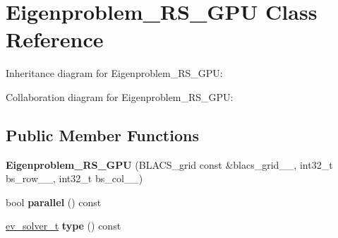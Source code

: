 \hypertarget{class_eigenproblem___r_s___g_p_u}{}\section{Eigenproblem\+\_\+\+R\+S\+\_\+\+G\+P\+U Class Reference}
\label{class_eigenproblem___r_s___g_p_u}


Inheritance diagram for Eigenproblem\+\_\+\+R\+S\+\_\+\+G\+P\+U\+:


Collaboration diagram for Eigenproblem\+\_\+\+R\+S\+\_\+\+G\+P\+U\+:
\subsection*{Public Member Functions}
\begin{DoxyCompactItemize}
\item 
\hypertarget{class_eigenproblem___r_s___g_p_u_af5e428c54a42c2e4068d11d3cfe5a10f}{}{\bfseries Eigenproblem\+\_\+\+R\+S\+\_\+\+G\+P\+U} (B\+L\+A\+C\+S\+\_\+grid const \&blacs\+\_\+grid\+\_\+\+\_\+, int32\+\_\+t bs\+\_\+row\+\_\+\+\_\+, int32\+\_\+t bs\+\_\+col\+\_\+\+\_\+)\label{class_eigenproblem___r_s___g_p_u_af5e428c54a42c2e4068d11d3cfe5a10f}

\item 
\hypertarget{class_eigenproblem___r_s___g_p_u_a50fe8eab8a8a6764f84aa31f0d6a436b}{}bool {\bfseries parallel} () const \label{class_eigenproblem___r_s___g_p_u_a50fe8eab8a8a6764f84aa31f0d6a436b}

\item 
\hypertarget{class_eigenproblem___r_s___g_p_u_a4defefb9cf5ff62d0f0d95a197e1811c}{}\hyperlink{eigenproblem_8h_a203f2c57422a6e64834e6e9ab85982bf}{ev\+\_\+solver\+\_\+t} {\bfseries type} () const \label{class_eigenproblem___r_s___g_p_u_a4defefb9cf5ff62d0f0d95a197e1811c}

\end{DoxyCompactItemize}
